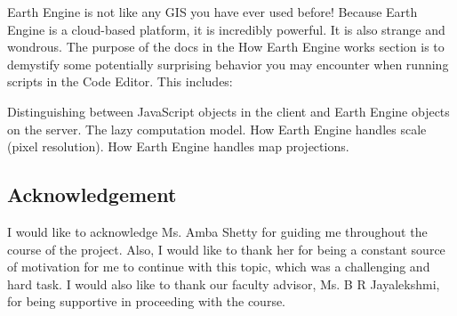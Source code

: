\documentclass[12pt]{svproc}
\begin{document}
Earth Engine is not like any GIS you have ever used before! Because Earth Engine is a cloud-based platform, it is incredibly powerful. It is also strange and wondrous. The purpose of the docs in the How Earth Engine works section is to demystify some potentially surprising behavior you may encounter when running scripts in the Code Editor. This includes:

    Distinguishing between JavaScript objects in the client and Earth Engine objects on the server.
    The lazy computation model. 
    How Earth Engine handles scale (pixel resolution).
    How Earth Engine handles map projections.


\subsection{Acknowledgement}
I would like to acknowledge Ms. Amba Shetty for guiding me throughout the course of the project. Also, I would like to thank her for being a constant source of motivation for me to continue with this topic, which was a challenging and hard task.
I would also like to thank our faculty advisor, Ms. B R Jayalekshmi, for being supportive in proceeding with the course. 
\end{document}
